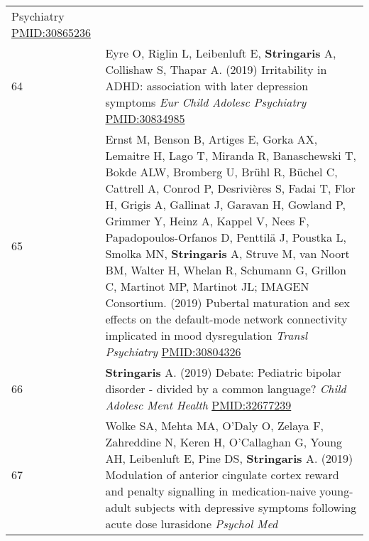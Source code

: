 \documentclass[
]{article}
\begin{document}
\begin{longtable}[]{@{}ll@{}}
\begin{minipage}[t]{0.94\columnwidth}
{Psychiatry} \url{PMID:30865236}\strut
\end{minipage}\tabularnewline
\begin{minipage}[t]{0.01\columnwidth}\raggedright
64\strut
\end{minipage} & \begin{minipage}[t]{0.94\columnwidth}\raggedright
Eyre O, Riglin L, Leibenluft E, \textbf{Stringaris} A, Collishaw S,
Thapar A. (2019) Irritability in ADHD: association with later depression
symptoms \emph{Eur Child Adolesc Psychiatry} \url{PMID:30834985}\strut
\end{minipage}\tabularnewline
\begin{minipage}[t]{0.01\columnwidth}\raggedright
65\strut
\end{minipage} & \begin{minipage}[t]{0.94\columnwidth}\raggedright
Ernst M, Benson B, Artiges E, Gorka AX, Lemaitre H, Lago T, Miranda R,
Banaschewski T, Bokde ALW, Bromberg U, Brühl R, Büchel C, Cattrell A,
Conrod P, Desrivières S, Fadai T, Flor H, Grigis A, Gallinat J, Garavan
H, Gowland P, Grimmer Y, Heinz A, Kappel V, Nees F, Papadopoulos-Orfanos
D, Penttilä J, Poustka L, Smolka MN, \textbf{Stringaris} A, Struve M,
van Noort BM, Walter H, Whelan R, Schumann G, Grillon C, Martinot MP,
Martinot JL; IMAGEN Consortium. (2019) Pubertal maturation and sex
effects on the default-mode network connectivity implicated in mood
dysregulation \emph{Transl Psychiatry} \url{PMID:30804326}\strut
\end{minipage}\tabularnewline
\begin{minipage}[t]{0.01\columnwidth}\raggedright
66\strut
\end{minipage} & \begin{minipage}[t]{0.94\columnwidth}\raggedright
\textbf{Stringaris} A. (2019) Debate: Pediatric bipolar disorder -
divided by a common language? \emph{Child Adolesc Ment Health}
\url{PMID:32677239}\strut
\end{minipage}\tabularnewline
\begin{minipage}[t]{0.01\columnwidth}\raggedright
67\strut
\end{minipage} & \begin{minipage}[t]{0.94\columnwidth}\raggedright
Wolke SA, Mehta MA, O'Daly O, Zelaya F, Zahreddine N, Keren H,
O'Callaghan G, Young AH, Leibenluft E, Pine DS, \textbf{Stringaris} A.
(2019) Modulation of anterior cingulate cortex reward and penalty
signalling in medication-naive young-adult subjects with depressive
symptoms following acute dose lurasidone \emph{Psychol Med}

\end{minipage}
\end{longtable}
\end{document}
